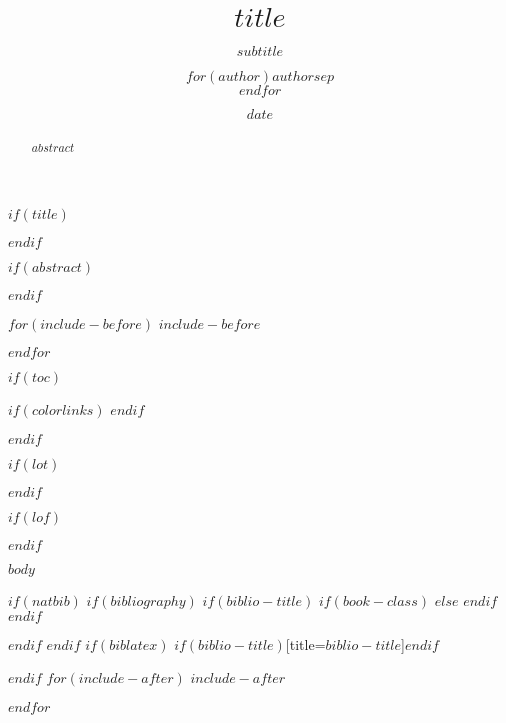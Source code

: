 \documentclass[doctor,twoside,chapterhead,otf]{znufethesis}
\title{\LARGE\textbf{$title$}}
\title{}
\subtitle{$subtitle$}
\author{$for(author)$$author$$sep$ \\ $endfor$}
\author{}
\date{$date$}
\date{}
\begin{document}
$if(title)$
\maketitle
$endif$

\cleardoublepage
\frontmatter
\pagestyle{plain}

$if(abstract)$
\begin{abstract}
$abstract$
\end{abstract}
$endif$




$for(include-before)$
$include-before$

$endfor$

$if(toc)$
{
$if(colorlinks)$
\hypersetup{linkcolor=$if(toccolor)$$toccolor$$else$black$endif$}
$endif$

\setcounter{tocdepth}{$toc-depth$}
\cleardoublepage
{} %
\tableofcontents        %
}
$endif$

$if(lot)$
\cleardoublepage
{} %
\listoftables           %
$endif$

$if(lof)$
\cleardoublepage
{} %
\listoffigures          %
$endif$

\mainmatter
\pagestyle{mpage}

$body$

$if(natbib)$
$if(bibliography)$
$if(biblio-title)$
$if(book-class)$
\renewcommand\bibname{$biblio-title$}
$else$
\renewcommand\refname{$biblio-title$}
$endif$
$endif$


$endif$
$endif$
$if(biblatex)$
\printbibliography$if(biblio-title)$[title=$biblio-title$]$endif$

$endif$
$for(include-after)$
$include-after$

$endfor$
\end{document}
